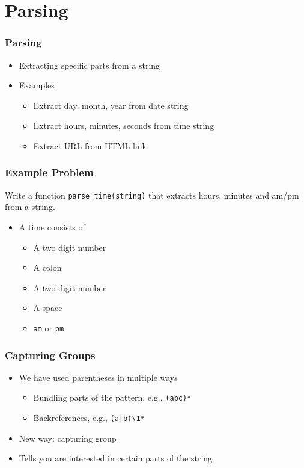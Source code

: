 \section{Parsing}

\frame{\tableofcontents[currentsection]}

\begin{frame}
  \frametitle{Parsing}
  \begin{itemize}
    \item Extracting specific parts from a string
    \item Examples
      \begin{itemize}
        \item Extract day, month, year from date string
        \item Extract hours, minutes, seconds from time string
        \item Extract URL from HTML link
      \end{itemize}
  \end{itemize}
\end{frame}

\begin{frame}
  \frametitle{Example Problem}
  \begin{center}
    Write a function \texttt{parse\_time(string)} that extracts hours, minutes and am/pm from a string.
  \end{center}
  \vskip5mm
  \begin{itemize}
    \item A time consists of
      \begin{itemize}
        \item A two digit number
        \item A colon
        \item A two digit number
        \item A space
        \item \texttt{am} or \texttt{pm}
      \end{itemize}
  \end{itemize}
\end{frame}

\begin{frame}
  \frametitle{Capturing Groups}
  \begin{itemize}
    \item We have used parentheses in multiple ways
      \begin{itemize}
        \item Bundling parts of the pattern, e.g., \texttt{(abc)*}
        \item Backreferences, e.g., \texttt{(a|b)\textbackslash1*}
      \end{itemize}
    \item New way: capturing group
    \item Tells you are interested in certain parts of the string
  \end{itemize}
\end{frame}

